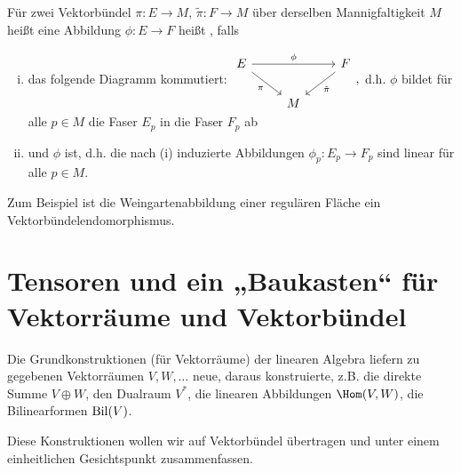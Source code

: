 \begin{df} \label{5.8}
    Für zwei Vektorbündel $\pi: E \to M$, $\tilde \pi: F \to M$ über derselben Mannigfaltigkeit $M$ heißt eine Abbildung $\phi: E \to F$ heißt , falls
    \begin{enumerate}[(i)]
        \item
            das folgende Diagramm kommutiert:
            \begin{math}
                \begin{tikzcd}
                    E \ar[rr,"\phi"] \ar[rd,"\pi"'] & & F \ar[ld,"\tilde \pi"] \\
                    & M
                \end{tikzcd},
            \end{math}
            d.h. $\phi$ bildet für alle $p \in M$ die Faser $E_p$ in die Faser $F_p$ ab
        \item
            und $\phi$  ist, d.h. die nach (i) induzierte Abbildungen $\phi_p: E_p \to F_p$ sind linear für alle $p \in M$.
    \end{enumerate}
    \begin{note}
        Zum Beispiel ist die Weingartenabbildung einer regulären Fläche ein Vektorbündelendomorphismus.
    \end{note}
\end{df}


\section[Tensoren]{Tensoren und ein „Baukasten“ für Vektorräume und Vektorbündel}

Die Grundkonstruktionen (für Vektorräume) der linearen Algebra liefern zu gegebenen Vektorräumen $V, W, \dotsc$ neue, daraus konstruierte, z.B. die direkte Summe $V \oplus W$, den Dualraum $V^*$, die linearen Abbildungen $\Hom(V,W)$, die Bilinearformen $\operatorname{Bil}(V)$.

Diese Konstruktionen wollen wir auf Vektorbündel übertragen und unter einem einheitlichen Gesichtspunkt zusammenfassen.


